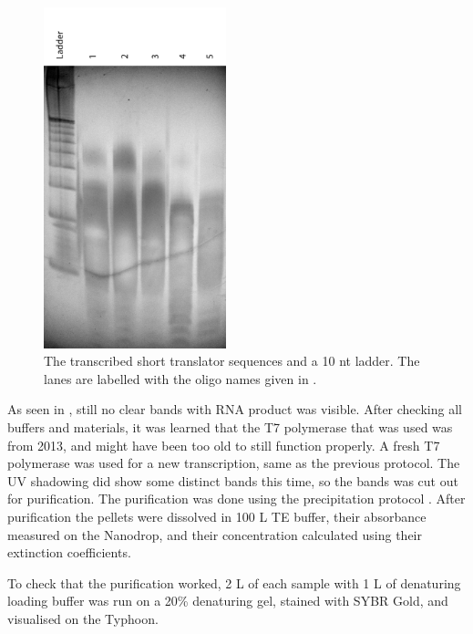 \begin{figure}[H]
\centering
\includegraphics[width=150pt]{images/translator_transcription_3.png}
\caption{The transcribed short translator sequences and a 10 nt ladder. The lanes are labelled with the oligo names given in .}
\label{translator_transcription_3}
\end{figure}

As seen in , still no clear bands with RNA product was visible. After checking all buffers and materials, it was learned that the T7 polymerase that was used was from 2013, and might have been too old to still function properly. A fresh T7 polymerase was used for a new transcription, same as the previous protocol. The UV shadowing did show some distinct bands this time, so the bands was cut out for purification. The purification was done using the precipitation protocol \cite{precipitationprotocol}. After purification the pellets were dissolved in 100 \si{\micro}L TE buffer, their absorbance measured on the Nanodrop, and their concentration calculated using their extinction coefficients.

To check that the purification worked, 2 \si{\micro}L of each sample with 1 \si{\micro}L of denaturing loading buffer was run on a 20\% denaturing gel, stained with SYBR Gold, and visualised on the Typhoon.

